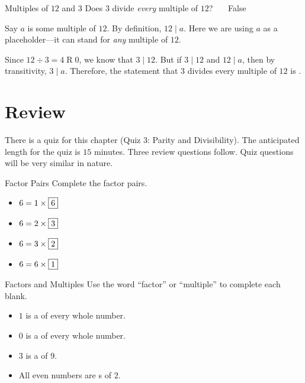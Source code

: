 \documentclass[a4paper,10pt]{report}
\begin{document}
\begin{problem}{Multiples of \(12\) and \(3\)}
 Does \(3\) divide \emph{every} multiple of \(12\)? \hfill {}~~~False

 \begin{solution}
  Say \(a\) is some multiple of \(12\). By definition, \(12 \mid a\). Here we
  are using \(a\) as a placeholder---it can stand for \emph{any} multiple of
  \(12\).

  Since \(12 \div 3 = 4 \operatorname{R} 0\), we know that \(3 \mid 12\). But
  if \(3 \mid 12\) and \(12 \mid a\), then by transitivity, \(3 \mid a\).
  Therefore, the statement that \(3\) divides every multiple of \(12\) is
  .
 \end{solution}
\end{problem}

\section{Review}

There is a quiz for this chapter (Quiz 3: Parity and Divisibility). The
anticipated length for the quiz is \(15\) minutes. Three review questions
follow. Quiz questions will be very similar in nature.

\begin{problem}{Factor Pairs}
 Complete the factor pairs.

 \begin{itemize}
  \item \(6 = 1 \times \Ans{6}\)
  \item \(6 = 2 \times \Ans{3}\)
  \item \(6 = 3 \times \Ans{2}\)
  \item \(6 = 6 \times \Ans{1}\)
 \end{itemize}
\end{problem}

\begin{problem}{Factors and Multiples}
 Use the word ``factor'' or ``multiple'' to complete each blank.

 \begin{itemize}
  \item \(1\) is a  of every whole number.
  \item \(0\) is a  of every whole number.
  \item \(3\) is a  of \(9\).
  \item All even numbers are s of \(2\).
 \end{itemize}
\end{problem}
\end{document}
